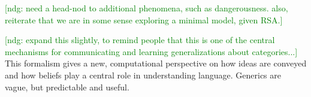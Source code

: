 \documentclass[10pt,letterpaper]{article}
\newcommand{\ndg}[1]{\textcolor{Green}{[ndg: #1]}}
\begin{document}
\ndg{need a head-nod to additional phenomena, such as dangerousness. also, reiterate that we are in some sense exploring a minimal model, given RSA.}

\ndg{expand this slightly, to remind people that this is one of the central mechanisms for communicating and learning generalizations about categories...}
This formalism gives a new, computational perspective on how ideas are conveyed and how beliefs play a central role in understanding language.
Generics are vague, but predictable and useful.




\setlength{\bibleftmargin}{.125in}
\setlength{\bibindent}{-\bibleftmargin}


\end{document}
